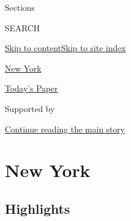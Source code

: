 Sections

SEARCH

\protect\hyperlink{site-content}{Skip to
content}\protect\hyperlink{site-index}{Skip to site index}

\href{https://www.nytimes3xbfgragh.onion/section/nyregion}{New York}

\href{https://myaccount.nytimes3xbfgragh.onion/auth/login?response_type=cookie\&client_id=vi}{}

\href{https://www.nytimes3xbfgragh.onion/section/todayspaper}{Today's
Paper}

Supported by

\protect\hyperlink{after-sponsor}{Continue reading the main story}

\hypertarget{new-york}{%
\section{New York}\label{new-york}}

\hypertarget{highlights}{%
\subsection{Highlights}\label{highlights}}


